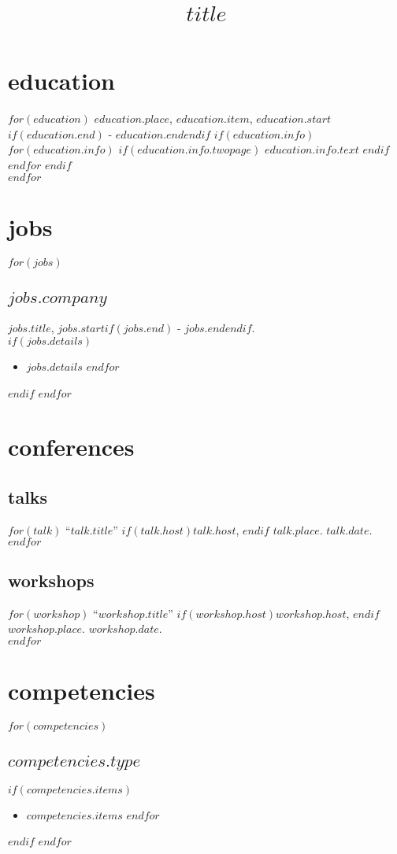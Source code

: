 \documentclass[11pt, A4]{article}
\title{$title$}
\begin{document}
\maketitle

\section{education}
$for(education)$
$education.place$, $education.item$, $education.start$$if(education.end)$ - $education.end$$endif$
$if(education.info)$ $for(education.info)$ $if(education.info.twopage)$ $education.info.text$ $endif$ $endfor$ $endif$ \\[.25cm]
$endfor$

\section{jobs}
$for(jobs)$
\subsection{$jobs.company$}
$jobs.title$,
$jobs.start$$if(jobs.end)$ - $jobs.end$$endif$.\\[.25cm]
$if(jobs.details)$
\begin{itemize}
$for(jobs.details)$
\item $jobs.details$
$endfor$
\end{itemize}
$endif$
$endfor$

\section{conferences}

\subsection{talks}
$for(talk)$
``$talk.title$''
$if(talk.host)$$talk.host$, $endif$
$talk.place$.
$talk.date$.\\[.25cm]
$endfor$

\subsection{workshops}
$for(workshop)$
``$workshop.title$''
$if(workshop.host)$$workshop.host$, $endif$
$workshop.place$.
$workshop.date$.\\[.25cm]
$endfor$

\section{competencies}
$for(competencies)$
\subsection{$competencies.type$}
$if(competencies.items)$
\begin{itemize}
$for(competencies.items)$
\item $competencies.items$
$endfor$
\end{itemize}
$endif$
$endfor$
\end{document}
